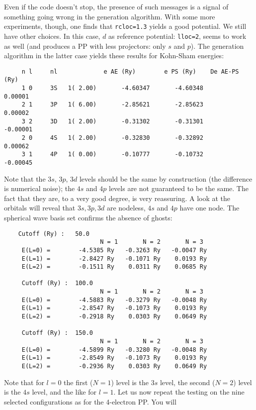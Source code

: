 \documentclass[12pt,a4paper]{article}
\begin{document}
Even if the code doesn't stop, the presence of such messages
is a signal of something going wrong in the generation algorithm.
With some more experiments, though, one finds that \texttt{rcloc=1.3} 
yields a good potential. We still have other choices. In this case, 
$d$ as reference potential: \texttt{lloc=2}, seems to work as well
(and produces a PP with less projectors: only $s$ and $p$). 
The generation algorithm in the latter case yields these 
results for Kohn-Sham energies:
\begin{verbatim}
     n l     nl             e AE (Ry)        e PS (Ry)    De AE-PS (Ry) 
     1 0     3S   1( 2.00)       -4.60347       -4.60348        0.00001
     2 1     3P   1( 6.00)       -2.85621       -2.85623        0.00002
     3 2     3D   1( 2.00)       -0.31302       -0.31301       -0.00001
     2 0     4S   1( 2.00)       -0.32830       -0.32892        0.00062
     3 1     4P   1( 0.00)       -0.10777       -0.10732       -0.00045
\end{verbatim}
Note that the $3s$, $3p$, $3d$ levels should be the same by construction
(the difference is numerical noise); the $4s$ and $4p$ levels are not
guaranteed to be the same. The fact that they are, to a very good degree,
is very reassuring. A look at the orbitals will reveal that $3s, 3p, 3d$
are nodeless, $4s$ and $4p$ have one node. The spherical wave basis 
set confirms the absence of ghosts:
\begin{verbatim}
    Cutoff (Ry) :   50.0
                           N = 1       N = 2       N = 3
     E(L=0) =        -4.5385 Ry   -0.3263 Ry   -0.0047 Ry
     E(L=1) =        -2.8427 Ry   -0.1071 Ry    0.0193 Ry
     E(L=2) =        -0.1511 Ry    0.0311 Ry    0.0685 Ry

     Cutoff (Ry) :  100.0
                           N = 1       N = 2       N = 3
     E(L=0) =        -4.5883 Ry   -0.3279 Ry   -0.0048 Ry
     E(L=1) =        -2.8547 Ry   -0.1073 Ry    0.0193 Ry
     E(L=2) =        -0.2918 Ry    0.0303 Ry    0.0649 Ry

     Cutoff (Ry) :  150.0
                           N = 1       N = 2       N = 3
     E(L=0) =        -4.5899 Ry   -0.3280 Ry   -0.0048 Ry
     E(L=1) =        -2.8549 Ry   -0.1073 Ry    0.0193 Ry
     E(L=2) =        -0.2936 Ry    0.0303 Ry    0.0649 Ry
\end{verbatim}
Note that for $l=0$ the first ($N=1$) level is the $3s$ level, 
the second ($N=2$) level is the $4s$ level, and the like for 
$l=1$. Let us now repeat the testing on the nine
selected configurations as for the 4-electron PP. You will
\end{document}
